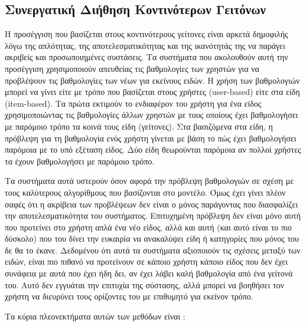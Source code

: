 \subsection{Συνεργατική Διήθηση Κοντινότερων Γειτόνων}
Η προσέγγιση που βασίζεται στους κοντινότερους γείτονες είναι αρκετά δημοφιλής λόγω της απλότητας, της αποτελεσματικότητας και της ικανότητάς της να παράγει ακριβείς και προσωποιημένες συστάσεις.\cite{ricci2011recommender} Τα συστήματα που ακολουθούν αυτή την προσέγγιση χρησιμοποιούν απευθείας τις βαθμολογίες των χρηστών για να προβλέψουν τις βαθμολογίες των νέων για εκείνους ειδών. Η χρήση των βαθμολογιών μπορεί να γίνει είτε με τρόπο που βασίζεται στους χρήστες ({\en user-based}) είτε στα είδη ({\en item-based}). Τα πρώτα εκτιμούν το ενδιαφέρον του χρήστη για ένα είδος χρησιμοποιώντας τις βαθμολογίες άλλων χρηστών με τους οποίους έχει βαθμολογήσει με παρόμοιο τρόπο τα κοινά τους είδη (γείτονες). Στα βασιζόμενα στα είδη, η πρόβλεψη για τη βαθμολογία ενός χρήστη γίνεται με βάση το πώς έχει βαθμολογήσει παρόμοια με το υπό εξέταση είδος. Δύο είδη θεωρούνται παρόμοια αν πολλοί χρήστες τα έχουν βαθμολογήσει με παρόμοιο τρόπο. \par
Τα συστήματα αυτά υστερούν όσον αφορά την πρόβλεψη βαθμολογιών σε σχέση με τους καλύτερους αλγορίθμους που βασίζονται στο μοντέλο.\cite{Koren:2008:FMN:1401890.1401944, Takacs:2007:MCG:1345448.1345466} Όμως έχει γίνει πλέον σαφές ότι η ακρίβεια των προβλέψεων δεν είναι ο μόνος παράγοντας που διασφαλίζει την αποτελεσματικότητα του συστήματος. Επιτυχημένη πρόβλεψη δεν είναι μόνο αυτή που προτείνει στο χρήστη απλά ένα νέο είδος, αλλά και αυτή (και αυτό είναι το πιο δύσκολο) που του δίνει την ευκαιρία να ανακαλύψει είδη ή κατηγορίες που μόνος του δε θα το έκανε.\cite{Good:1999:CCF:315149.315352} Δεδομένου ότι αυτά τα συστήματα αξιοποιούν τις σχέσεις μεταξύ των ειδών, είναι πιο πιθανό να προτεί\-νουν σε κάποιο χρήστη κάποιο είδος που δεν έχει συνάφεια με αυτά που έχει ήδη δει, αν έχει λάβει καλή βαθμολογία από ένα γείτονά του. Αυτό δεν εγγυάται την επιτυχία της σύστασης, αλλά μπορεί να βοηθήσει τον χρήστη να διευρύνει τους ορίζοντες του με επιθυμητό για εκείνον τρόπο. \par
Τα κύρια πλεονεκτήματα αυτών των μεθόδων είναι \cite{ricci2011recommender}:
